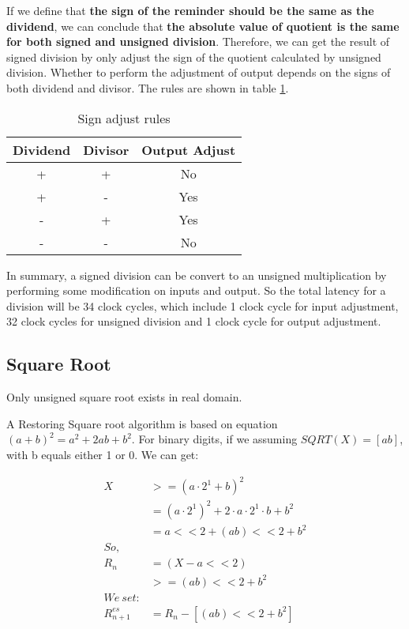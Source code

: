 If we define that {\bf the sign of the reminder should be the same as the dividend},
we can conclude that {\bf the absolute value of quotient is the same for both signed and
unsigned division}. Therefore, we can get the result of signed division by only adjust
the sign of the quotient calculated by unsigned division. Whether to perform the
adjustment of output depends on the signs of both dividend and divisor. The rules
are shown in table \ref{tab:div_sign}.

\begin{table}[!ht]
\centering
\caption{Sign adjust rules}
\label{tab:div_sign}
\begin{tabular}{|c|c|c|}
\hline
Dividend & Divisor & Output Adjust\\
\hline
+ & + & No\\
+ & - & Yes\\
- & + & Yes\\
- & - & No\\
\hline
\end{tabular}
\end{table}

In summary, a signed division can be convert to an unsigned multiplication by
performing some modification on inputs and output. So the total latency for a division
will be 34 clock cycles, which include 1 clock cycle for input adjustment, 32 clock cycles
for unsigned division and 1 clock cycle for output adjustment.

\subsection[Square Root]{Square Root}
Only unsigned square root exists in real domain.

A Restoring Square root algorithm is based on equation $(a+b)^2=a^2+2ab+b^2$. For binary
digits, if we assuming $SQRT(X)=[ab]$, with b equals either 1 or 0. We can
get:

\begin{align*}
X & >= (a\cdot 2^1+b)^2\\
  & = (a\cdot 2^1)^2+2\cdot a\cdot 2^1 \cdot b + b^2\\
  & = a<<2 + (ab)<<2 + b^2\\
So,\\
R_{n} & = (X-a<<2)\\
  & >= (ab)<<2 + b^2\\
We\ set:\\
R_{n+1}^{es} &= R_{n} - [(ab)<<2 + b^2]
\end{align*}

